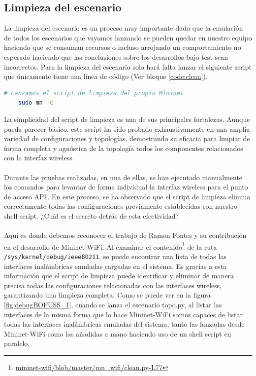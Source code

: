 \subsection{Limpieza del escenario}

La limpieza del escenario es un proceso muy importante dado que la emulación de todos los escenarios que vayamos lanzando se pueden quedar en nuestro equipo haciendo que se consuman recursos o incluso arrojando un comportamiento no esperado haciendo que las conclusiones sobre los desarrollos bajo test sean incorrectos. Para la limpieza del escenario solo hará falta lanzar el siguiente script que únicamente tiene una línea de código (Ver bloque \ref{code:clean}).\\

\begin{lstlisting}[language= bash, style=Consola, caption={Script de limpieza del escenario - clean.sh},label=code:clean]
    # Lanzamos el script de limpieza del propio Mininet
    sudo mn -c
\end{lstlisting}
\vspace{0.5cm}


La simplicidad del script de limpieza es una de sus principales fortalezas. Aunque pueda parecer básico, este script ha sido probado exhaustivamente en una amplia variedad de configuraciones y topologías, demostrando su eficacia para limpiar de forma completa y agnóstica de la topología todos los componentes relacionados con la interfaz wireless.\\
\\
Durante las pruebas realizadas, en una de ellas, se han ejecutado manualmente los comandos para levantar de forma individual la interfaz wireless para el punto de acceso AP1. En este proceso, se ha observado que el script de limpieza elimina correctamente todas las configuraciones previamente establecidas con nuestro shell script. ¿Cuál es el secreto detrás de esta efectividad?\\
\\
Aquí es donde debemos reconocer el trabajo de Ramon Fontes y su contribución en el desarrollo de Mininet-WiFi. Al examinar el contenido\footnote{\href{https://github.com/intrig-unicamp/mininet-wifi/blob/master/mn_wifi/clean.py\#L77}{mininet-wifi/blob/master/mn\_wifi/clean.py-L77}} de la ruta \texttt{/sys/kernel/debug/ieee80211}, se puede encontrar una lista de todas las interfaces inalámbricas emuladas cargadas en el sistema. Es gracias a esta información que el script de limpieza puede identificar y eliminar de manera precisa todas las configuraciones relacionadas con las interfaces wireless, garantizando una limpieza completa. Como se puede ver en la figura \ref{fig:debugBOFUSS_1}, cuando se lanza el escenario topo.py, al listar las interfaces de la misma forma que lo hace Mininet-WiFi somos capaces de listar todas las interfaces inalámbricas emuladas del sistema, tanto las lanzadas desde Mininet-WiFi como las añadidas a mano haciendo uso de un shell script en paralelo.

